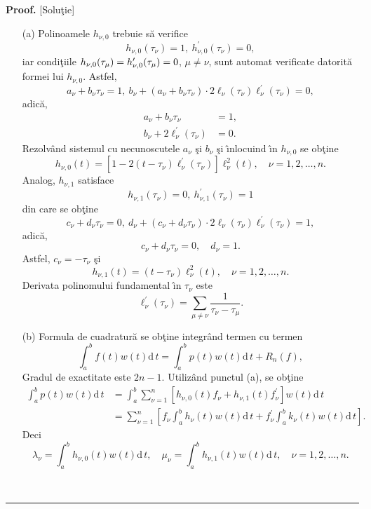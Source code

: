 \documentclass{article}%
\providecommand{\U}[1]{\protect\rule{.1in}{.1in}}
\newenvironment{proof}[1][Proof]{\noindent\textbf{#1.} }{\ \rule{0.5em}{0.5em}}
\begin{document}
\begin{proof}
[Solu\c{t}ie]

\begin{enumerate}
\item[(a)] Polinoamele $h_{\nu,0}$ trebuie s\u{a} verifice%
\[
h_{\nu,0}\left(  \tau_{\nu}\right)  =1,~h_{\nu,0}^{\prime}\left(  \tau_{\nu
}\right)  =0,
\]
iar condi\c{t}iile  $h_{\nu,0}(\tau_{%
\mu
})=h_{\nu,0}^{\prime}(\tau_{%
\mu
})=0$, $\mu\neq\nu$, sunt automat verificate datorit\u{a} formei lui
$h_{\nu,0}$. Astfel,%
\[
a_{\nu}+b_{\nu}\tau_{\nu}=1,~b_{\nu}+\left(  a_{\nu}+b_{\nu}\tau_{\nu}\right)
\cdot2\ell_{\nu}\left(  \tau_{\nu}\right)  \ell_{\nu}^{\prime}\left(
\tau_{\nu}\right)  =0,
\]
adic\u{a},%
\begin{align*}
a_{\nu}+b_{\nu}\tau_{\nu} &  =1,\\
b_{\nu}+2\ell_{\nu}^{\prime}\left(  \tau_{\nu}\right)   &  =0.
\end{align*}
Rezolv\^{a}nd sistemul cu necunoscutele $a_{\nu}$ \c{s}i  $b_{\nu}$ \c{s}i
\^{\i}nlocuind \^{\i}n  $h_{\nu,0}$ se ob\c{t}ine%
\[
h_{\nu,0}(t)=\left[  1-2(t-\tau_{\nu})\ell_{\nu}^{\prime}(\tau_{\nu})\right]
\ell_{\nu}^{2}(t),\quad\nu=1,2,\dots,n.
\]
Analog, $h_{\nu,1}$ satisface%
\[
h_{\nu,1}\left(  \tau_{\nu}\right)  =0,~h_{\nu,1}^{\prime}\left(  \tau_{\nu
}\right)  =1
\]
din care se ob\c{t}ine
\[
c_{\nu}+d_{\nu}\tau_{\nu}=0,~d_{\nu}+(c_{\nu}+d_{\nu}\tau_{\nu})\cdot
2\ell_{\nu}(\tau_{\nu})\ell_{\nu}^{\prime}(\tau_{\nu})=1,
\]
adic\u{a},
\[
c_{\nu}+d_{\nu}\tau_{\nu}=0,\quad d_{\nu}=1.
\]
Astfel, $c_{\nu}=-\tau_{\nu}$ \c{s}i\
\[
h_{\nu,1}(t)=(t-\tau_{\nu})\ell_{\nu}^{2}(t),\quad\nu=1,2,\dots,n.
\]
Derivata polinomului fundamental \^{\i}n $\tau_{\nu}$ este%
\[
\ell_{\nu}^{\prime}(\tau_{\nu})=\sum_{\mu\neq\nu}\frac{1}{\tau_{\nu}-\tau
_{\mu}}.
\]


\item[(b)] Formula de cuadratur\u{a} se ob\c{t}ine integr\^{a}nd termen cu
termen%
\[
\int_{a}^{b}f(t)w(t)\mathrm{d}\,t=\int_{a}^{b}p(t)w(t)\mathrm{d}\,t+R_{n}(f),
\]
Gradul de exactitate este $2n-1$. Utiliz\^{a}nd punctul (a), se ob\c{t}ine%
\begin{align*}
\int_{a}^{b}p(t)w(t)\mathrm{d}\,t &  =\int_{a}^{b}\sum_{\nu=1}^{n}\left[
h_{\nu,0}(t)f_{\nu}+h_{\nu,1}\left(  t\right)  f_{\nu}^{\prime}\right]
w(t)\mathrm{d}\,t\\
&  =\sum_{\nu=1}^{n}\left[  f_{\nu}\int_{a}^{b}h_{\nu}(t)w(t)\mathrm{d}%
\,t+f_{\nu}^{\prime}\int_{a}^{b}k_{\nu}\left(  t\right)  w(t)\mathrm{d}%
\,t\right]  .
\end{align*}
Deci%
\[
\lambda_{\nu}=\int_{a}^{b}h_{\nu,0}(t)w(t)\mathrm{d}\,t,\quad\mu_{\nu}%
=\int_{a}^{b}h_{\nu,1}\left(  t\right)  w(t)\mathrm{d}\,t,\quad\nu
=1,2,\dots,n.
\]



\end{enumerate}
\end{proof}
\end{document}
